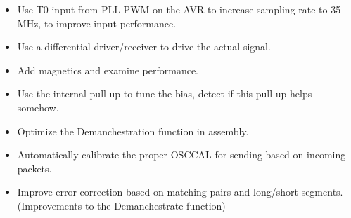 \documentclass[13pt]{ltxdoc}
\begin{document}
\begin{itemize}
\item Use T0 input from PLL PWM on the AVR to increase sampling rate to 35 MHz, to improve input performance.
\item Use a differential driver/receiver to drive the actual signal.
\item Add magnetics and examine performance.
\item Use the internal pull-up to tune the bias, detect if this pull-up helps somehow.
\item Optimize the Demanchestration function in assembly.
\item Automatically calibrate the proper OSCCAL for sending based on incoming packets.
\item Improve error correction based on matching pairs and long/short segments. (Improvements to the Demanchestrate function)
\end{itemize}
\end{document}
